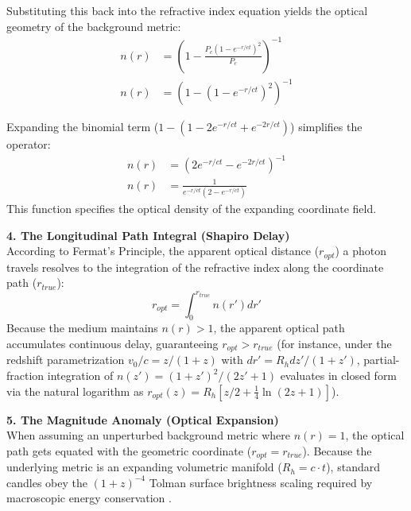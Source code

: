 Substituting this back into the refractive index equation yields the optical geometry of the background metric:
\begin{align}
    n(r) &= \left( 1 - \frac{P_c (1 - e^{-r/ct})^2}{P_c} \right)^{-1} \nonumber \\
    n(r) &= \left( 1 - (1 - e^{-r/ct})^2 \right)^{-1}
\end{align}

Expanding the binomial term ($1 - (1 - 2e^{-r/ct} + e^{-2r/ct})$) simplifies the operator:
\begin{align}
    n(r) &= \left( 2e^{-r/ct} - e^{-2r/ct} \right)^{-1} \nonumber \\
    n(r) &= \frac{1}{e^{-r/ct}(2 - e^{-r/ct})}
\end{align}
This function specifies the optical density of the expanding coordinate field.

\vspace{0.2 cm}

\textbf{4. The Longitudinal Path Integral (Shapiro Delay)} \\ 
According to Fermat's Principle, the apparent optical distance ($r_{opt}$) a photon travels resolves to the integration of the refractive index along the coordinate path ($r_{true}$):
\begin{equation}
    r_{opt} = \int_{0}^{r_{true}} n(r') dr'
\end{equation}
Because the medium maintains $n(r) > 1$, the apparent optical path accumulates continuous delay, guaranteeing $r_{opt} > r_{true}$ (for instance, under the redshift parametrization $v_0/c = z/(1+z)$ with $dr' = R_h dz'/(1+z')$, partial-fraction integration of $n(z') = (1+z')^2/(2z'+1)$ evaluates in closed form via the natural logarithm as $r_{opt}(z) = R_h[z/2 + \frac{1}{4}\ln(2z+1)]$). %

\vspace{0.2 cm}

\textbf{5. The Magnitude Anomaly (Optical Expansion)} \\ 
When assuming an unperturbed background metric where $n(r) = 1$, the optical path gets equated with the geometric coordinate ($r_{opt} = r_{true}$). Because the underlying metric is an expanding volumetric manifold ($R_h = c \cdot t$), standard candles obey the $(1+z)^{-4}$ Tolman surface brightness scaling required by macroscopic energy conservation \cite{tolman1930estimation, lubin2001tolman}.

